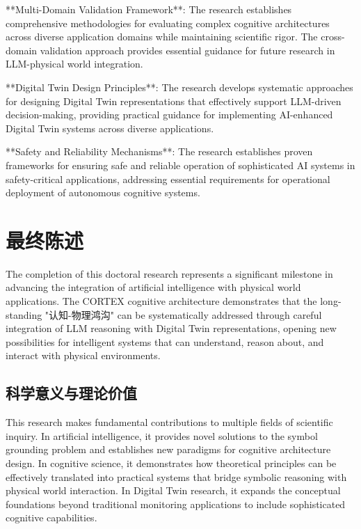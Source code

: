 **Multi-Domain Validation Framework**: The research establishes comprehensive methodologies for evaluating complex cognitive architectures across diverse application domains while maintaining scientific rigor. The cross-domain validation approach provides essential guidance for future research in LLM-physical world integration.

**Digital Twin Design Principles**: The research develops systematic approaches for designing Digital Twin representations that effectively support LLM-driven decision-making, providing practical guidance for implementing AI-enhanced Digital Twin systems across diverse applications.

**Safety and Reliability Mechanisms**: The research establishes proven frameworks for ensuring safe and reliable operation of sophisticated AI systems in safety-critical applications, addressing essential requirements for operational deployment of autonomous cognitive systems.

\section{最终陈述}

The completion of this doctoral research represents a significant milestone in advancing the integration of artificial intelligence with physical world applications. The CORTEX cognitive architecture demonstrates that the long-standing "认知-物理鸿沟" can be systematically addressed through careful integration of LLM reasoning with Digital Twin representations, opening new possibilities for intelligent systems that can understand, reason about, and interact with physical environments.

\subsection{科学意义与理论价值}

This research makes fundamental contributions to multiple fields of scientific inquiry. In artificial intelligence, it provides novel solutions to the symbol grounding problem and establishes new paradigms for cognitive architecture design. In cognitive science, it demonstrates how theoretical principles can be effectively translated into practical systems that bridge symbolic reasoning with physical world interaction. In Digital Twin research, it expands the conceptual foundations beyond traditional monitoring applications to include sophisticated cognitive capabilities.

